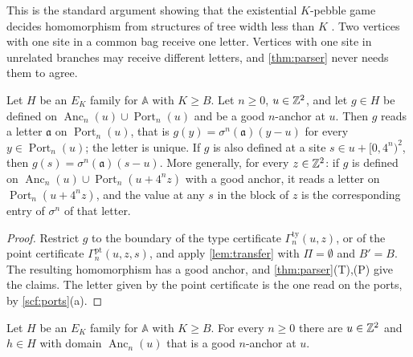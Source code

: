 This is the standard argument showing that the existential $K$-pebble game decides homomorphism from structures of tree width less than $K$ \cite{KolaitisVardi00,DKV02}. Two vertices with one site in a common bag receive one letter. Vertices with one site in unrelated branches may receive different letters, and \cref{thm:parser} never needs them to agree.

\begin{corollary}\label{scf:readout}
Let $H$ be an $E_K$ family for $\mathbb A$ with $K\ge B$. Let $n\ge0$, $u\in\mathbb{Z}^2$, and let $g\in H$ be defined on $\operatorname{Anc}_n(u)\cup\operatorname{Port}_n(u)$ and be a good $n$-anchor at $u$. Then $g$ reads a letter $\mathfrak a$ on $\operatorname{Port}_n(u)$, that is $g(y)=\sigma^n(\mathfrak a)(y-u)$ for every $y\in\operatorname{Port}_n(u)$; the letter is unique. If $g$ is also defined at a site $s\in u+[0,4^n)^2$, then $g(s)=\sigma^n(\mathfrak a)(s-u)$. More generally, for every $z\in\mathbb{Z}^2$: if $g$ is defined on $\operatorname{Anc}_n(u)\cup\operatorname{Port}_n(u+4^nz)$ with a good anchor, it reads a letter on $\operatorname{Port}_n(u+4^nz)$, and the value at any $s$ in the block of $z$ is the corresponding entry of $\sigma^n$ of that letter.
\end{corollary}

\begin{proof}
Restrict $g$ to the boundary of the type certificate $\Gamma^{\mathrm{ty}}_n(u,z)$, or of the point certificate $\Gamma^{\mathrm{pt}}_n(u,z,s)$, and apply \cref{lem:transfer} with $\Pi=\emptyset$ and $B'=B$. The resulting homomorphism has a good anchor, and \cref{thm:parser}(T),(P) give the claims. The letter given by the point certificate is the one read on the ports, by \cref{scf:ports}(a).
\end{proof}

\begin{proposition}\label{prop:anchors}
Let $H$ be an $E_K$ family for $\mathbb A$ with $K\ge B$. For every $n\ge0$ there are $u\in\mathbb{Z}^2$ and $h\in H$ with domain $\operatorname{Anc}_n(u)$ that is a good $n$-anchor at $u$.
\end{proposition}


